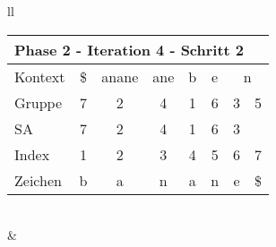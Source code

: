 \begin{table}[H]
\begin{adjustbox}{max width=\textwidth}
\begin{tabular}{ll}
\begin{tabular}{lccccccc}
\multicolumn{8}{l}{Phase 2 - Iteration 4 - Schritt 2}                                                                                                                                                               \\ \hline
\multicolumn{1}{l|}{Kontext} & \multicolumn{1}{c|}{\$}   & \multicolumn{1}{c|}{anane} & \multicolumn{1}{c|}{ane} & \multicolumn{1}{c|}{\cellcolor[HTML]{\green}b} & \multicolumn{1}{c|}{e} & \multicolumn{2}{c}{n} \\
\multicolumn{1}{l|}{Gruppe}  & \multicolumn{1}{c|}{7}    & \multicolumn{1}{c|}{2}     & \multicolumn{1}{c|}{4}   & \multicolumn{1}{c|}{\cellcolor[HTML]{\green}1} & \multicolumn{1}{c|}{6} & 3         & 5          \\ 
\multicolumn{1}{l|}{SA}      & \multicolumn{1}{c|}{7}    & \multicolumn{1}{c|}{2}     & \multicolumn{1}{c|}{4}   & \multicolumn{1}{c|}{\cellcolor[HTML]{\green}1} & \multicolumn{1}{c|}{6} & 3         &            \\ \hline
\multicolumn{1}{l|}{Index}   & \cellcolor[HTML]{\green}1 & 2                          & 3                        & 4                                              & 5                      & 6         & 7          \\
\multicolumn{1}{l|}{Zeichen} & \cellcolor[HTML]{\green}b & a                          & n                        & a                                              & n                      & e         & \$        
\end{tabular}

\\
&
\\


\end{tabular}
\end{adjustbox}
\end{table}
